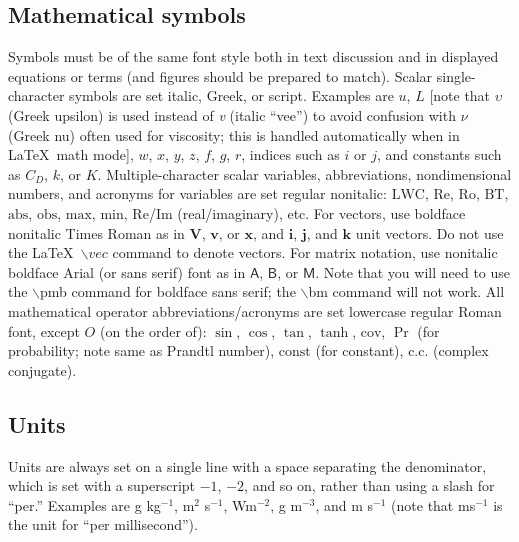 \documentclass[draft]{ametsoc}
\begin{document}
\subsection{Mathematical symbols}\label{mathematical-symbols}

Symbols must be of the same font style both in text discussion and in
displayed equations or terms (and figures should be prepared to match).
Scalar single-character symbols are set italic, Greek, or script.
Examples are \(u\), \(L\) {[}note that \(\upsilon\) (Greek upsilon) is
used instead of \emph{v} (italic ``vee'') to avoid confusion with
\(\nu\) (Greek nu) often used for viscosity; this is handled
automatically when in \LaTeX~math mode{]}, \(w\), \(x\), \(y\), \(z\),
\(f\), \(g\), \(r\), indices such as \(i\) or \(j\), and constants such
as \(C_D\), \(k\), or \(K\). Multiple-character scalar variables,
abbreviations, nondimensional numbers, and acronyms for variables are
set regular nonitalic: \(\mathrm{LWC}\), \(\mathrm{Re}\),
\(\mathrm{Ro}\), \(\mathrm{BT}\), \(\mathrm{abs}\), \(\mathrm{obs}\),
\(\mathrm{max}\), \(\mathrm{min}\), \(\mathrm{Re}\)/\(\mathrm{Im}\)
(real/imaginary), etc. For vectors, use boldface nonitalic Times Roman
as in \(\mathbf{V}\), \(\mathbf{v}\), or \(\mathbf{x}\), and
\(\mathbf{i}\), \(\mathbf{j}\), and \(\mathbf{k}\) unit vectors. Do not
use the \LaTeX~\(\backslash vec\) command to denote vectors. For matrix
notation, use nonitalic boldface Arial (or sans serif) font as in
\(\pmb{\mathsf{A}}\), \(\pmb{\mathsf{B}}\), or \(\pmb{\mathsf{M}}\).
Note that you will need to use the \(\backslash\)pmb command for
boldface sans serif; the \(\backslash\)bm command will not work. All
mathematical operator abbreviations/acronyms are set lowercase regular
Roman font, except \(O\) (on the order of): \(\sin\), \(\cos\),
\(\tan\), \(\tanh\), \(\mathrm{cov}\), \(\Pr\) (for probability; note
same as Prandtl number), \(\mathrm{const}\) (for constant),
\(\mathrm{c.c.}\) (complex conjugate).

\subsection{Units}\label{units}

Units are always set on a single line with a space separating the
denominator, which is set with a superscript \(-1\), \(-2\), and so on,
rather than using a slash for ``per.'' Examples are g kg\(^{-1}\),
m\(^2\) s\(^{-1}\), Wm\(^{-2}\), g m\(^{-3}\), and m s\(^{-1}\) (note
that ms\(^{-1}\) is the unit for ``per millisecond'').
\end{document}
